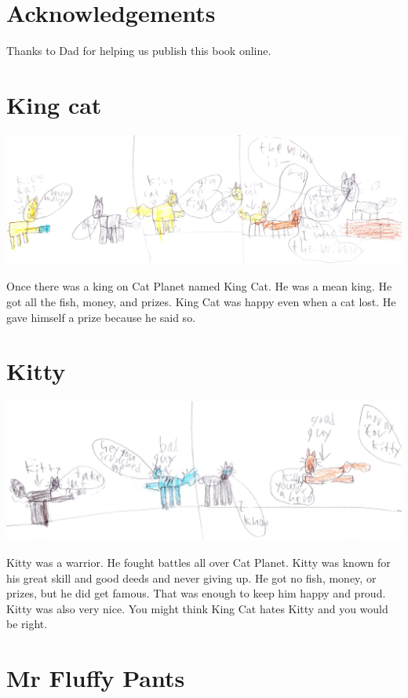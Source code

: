 \documentclass[]{krantz}
\begin{document}
\hypertarget{acknowledgements}{%
\chapter*{Acknowledgements}\label{acknowledgements}}


Thanks to Dad for helping us publish this book online.

\hypertarget{king-cat}{%
\chapter{King cat}\label{king-cat}}

\includegraphics{img/thewinner.jpg}

Once there was a king on Cat Planet named King Cat. He was a mean king.
He got all the fish, money, and prizes. King Cat was happy even when a
cat lost. He gave himself a prize because he said so.

\hypertarget{kitty}{%
\chapter{Kitty}\label{kitty}}

\includegraphics{img/kittyhero.jpg}

Kitty was a warrior. He fought battles all over Cat Planet. Kitty was
known for his great skill and good deeds and never giving up. He got no
fish, money, or prizes, but he did get famous. That was enough to keep
him happy and proud. Kitty was also very nice. You might think King Cat
hates Kitty and you would be right.

\hypertarget{mr-fluffy-pants}{%
\chapter{Mr Fluffy Pants}\label{mr-fluffy-pants}}
\end{document}
